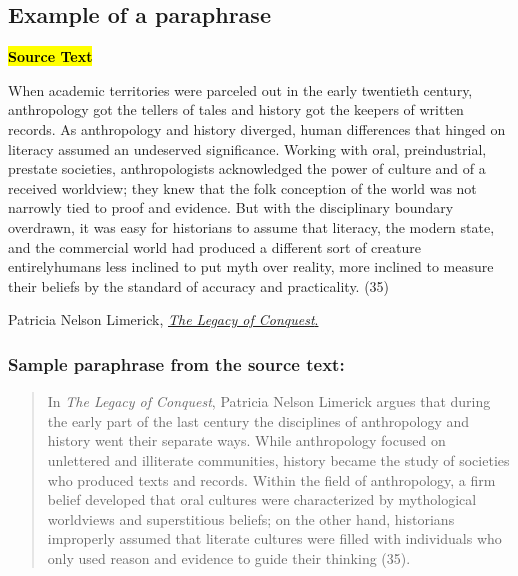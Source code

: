 \subsection{Example of a paraphrase}

\begin{tcolorbox}[enhanced,width=4.2in,left=.3in, right=.3in,
   drop fuzzy shadow southeast,
    boxrule=0.4pt,sharp corners,colframe=black!80!black,colback=white!10]

\medskip

{\small
\begin{doublespacing}
\textbf{\hl{Source Text}}
\smallskip

\hspace{.5cm}When academic territories were parceled out in the early twentieth century,
anthropology got the tellers of tales and history got the keepers of written
records. As anthropology and history diverged, human differences that
hinged on literacy assumed an undeserved significance. Working with oral,
preindustrial, prestate societies, anthropologists acknowledged the power
of culture and of a received worldview; they knew that the folk conception
of the world was not narrowly tied to proof and evidence. But with the
disciplinary boundary overdrawn, it was easy for historians to assume that
literacy, the modern state, and the commercial world had produced a different
sort of creature entirely\textemdash humans less inclined to put myth over reality,
more inclined to measure their beliefs by the standard of accuracy and
practicality. (35)

\bigskip

\noindent\textemdash Patricia Nelson Limerick, \href{http://libcat.dartmouth.edu/record=b1422593~S1}{\emph{The Legacy of Conquest}.
}

\bigskip

\end{doublespacing}}

\end{tcolorbox}


\subsubsection*{Sample paraphrase from the source text:}

\begin{quote}
In \emph{The Legacy of Conquest}, Patricia Nelson Limerick argues that during the
early part of the last century the disciplines of anthropology and history
went their separate ways. While anthropology focused on unlettered and illiterate communities,
history became the study of societies who produced texts and records. Within
the field of anthropology, a firm belief developed that oral cultures were
characterized by mythological worldviews and superstitious beliefs; on
the other hand, historians improperly assumed that literate cultures were filled with
individuals who only used reason and evidence to guide their thinking (35).
\end{quote}





